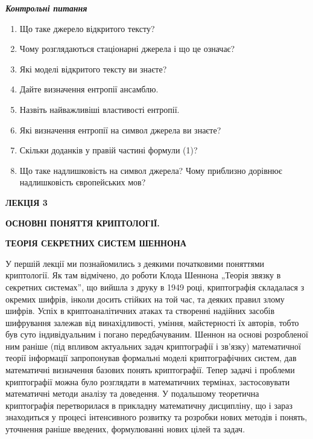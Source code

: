 \bigskip


\bigskip

{\centering\bfseries\itshape
Контрольні питання
\par}


\bigskip


\bigskip

\liststyleWWviiiNumxii
\begin{enumerate}
\item Що таке джерело відкритого тексту?
\item Чому розглядаються стаціонарні джерела і що це означає?
\item Які моделі відкритого тексту ви знаєте?
\item Дайте визначення ентропії ансамблю.
\item Назвіть найважливіші властивості ентропії.
\item Які визначення ентропії на символ джерела ви знаєте?
\item Скільки доданків у правій частині формули (1)?
\item Що таке надлишковість на символ джерела? Чому приблизно дорівнює
надлишковість європейських мов?
\end{enumerate}

\bigskip


\bigskip


\bigskip

{\bfseries
ЛЕКЦІЯ  3}


\bigskip

{\centering\bfseries
ОСНОВНІ ПОНЯТТЯ КРИПТОЛОГІЇ.
\par}

{\centering\bfseries
ТЕОРІЯ СЕКРЕТНИХ СИСТЕМ ШЕННОНА
\par}


\bigskip


\bigskip

У першій лекції ми познайомились з деякими початковими поняттями криптології. Як
там відмічено, до роботи Клода Шеннона „Теорія зв{\textquotesingle}язку в
секретних системах”, що вийшла з друку в 1949 році, криптографія складалася з 
окремих шифрів, інколи досить стійких на той час, та деяких правил злому
шифрів. Успіх в криптоаналітичних атаках та створенні надійних засобів
шифрування  залежав від винахідливості, уміння, майстерності їх авторів, тобто
був суто індивідуальним і погано передбачуваним. Шеннон на основі розробленої
ним раніше (під впливом актуальних задач криптографії і зв’язку) математичної
теорії інформації запропонував формальні моделі криптографічних систем, дав
математичні визначення базових понять криптографії. Тепер задачі і проблеми
криптографії можна було розглядати в математичних термінах, застосовувати
математичні методи аналізу та доведення. У подальшому теоретична криптографія 
перетворилася в прикладну математичну дисципліну, що і зараз знаходиться  у
процесі інтенсивного розвитку та розробки нових методів і понять, уточнення
раніше введених, формулюванні нових цілей та задач. 


